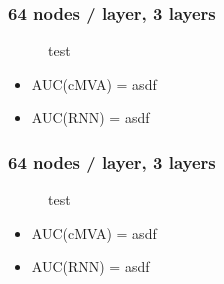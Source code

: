 \documentclass{beamer}
\begin{document}
\begin{frame}
  \frametitle{64 nodes / layer, 3 layers}

  \begin{figure}[htb]
    \centering
    \caption{test}
  \end{figure}

  \begin{itemize}
  \item AUC(cMVA) = asdf
  \item AUC(RNN) = asdf
  \end{itemize}
\end{frame}

\begin{frame}
  \frametitle{64 nodes / layer, 3 layers}

  \begin{figure}[htb]
    \centering

    \caption{test}
  \end{figure}

  \begin{itemize}
  \item AUC(cMVA) = asdf
  \item AUC(RNN) = asdf
  \end{itemize}
\end{frame}
\end{document}
